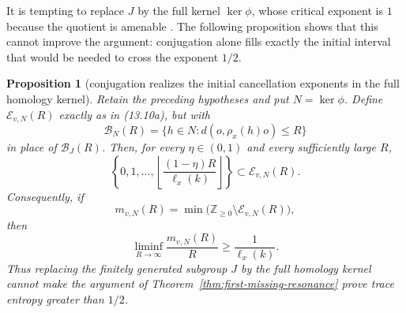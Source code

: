 \documentclass[11pt,reqno]{amsart}
\newtheorem{proposition}[theorem]{Proposition}
\theoremstyle{definition}
\theoremstyle{remark}
\newcommand{\Z}{\mathbb Z}
\begin{document}
It is tempting to replace \(J\) by the full kernel \(\ker\phi\), whose
critical exponent is \(1\) because the quotient is amenable
\cite{DougallSharp}.  The following proposition shows that this
cannot improve the argument: conjugation alone fills exactly the initial
interval that would be needed to cross the exponent \(1/2\).

\begin{proposition}[conjugation realizes the initial cancellation exponents in the full homology kernel]
\label{prop:kernel-resonance-saturation}
Retain the preceding hypotheses and put \(N=\ker\phi\).  Define
\(\mathcal E_{v,N}(R)\) exactly as in (13.10a), but with
\[
 \mathcal B_N(R)=
 \{h\in N:d(o,\rho_x(h)o)\le R\}
\]
in place of \(\mathcal B_J(R)\).  Then, for every \(\eta\in(0,1)\) and
every sufficiently large \(R\),
\[
 \left\{0,1,\ldots,
 \left\lfloor\frac{(1-\eta)R}{\ell_x(k)}\right\rfloor
 \right\}
 \subset\mathcal E_{v,N}(R).
\tag{13.10k}
\]
Consequently, if
\[
 m_{v,N}(R)=
 \min\bigl(\Z_{\ge0}\setminus\mathcal E_{v,N}(R)\bigr),
\]
then
\[
 \liminf_{R\to\infty}\frac{m_{v,N}(R)}R
 \ge\frac1{\ell_x(k)}.
\tag{13.10l}
\]
Thus replacing the finitely generated subgroup \(J\) by the full homology
kernel cannot make the argument of
Theorem~\ref{thm:first-missing-resonance} prove trace entropy greater than
\(1/2\).
\end{proposition}
\end{document}
